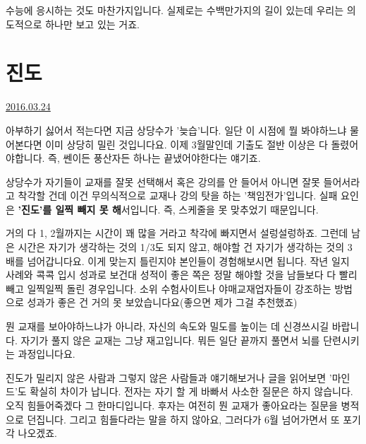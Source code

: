 수능에 응시하는 것도 마찬가지입니다. 실제로는 수백만가지의 길이 있는데 우리는 의도적으로 하나만 보고 있는 거죠.
\vspace{5mm}






\section{진도}
\href{https://www.kockoc.com/Apoc/692514}{2016.03.24}

\vspace{5mm}

아부하기 싫어서 적는다면 지금 상당수가 '늦습'니다.
일단 이 시점에 뭘 봐야하느냐 물어본다면 이미 상당히 밀린 것입니다요.
이제 3월말인데 기출도 절반 이상은 다 돌렸어야합니다. 즉, 쎈이든 풍산자든 하나는 끝냈어야한다는 얘기죠.
\vspace{5mm}

상당수가 자기들이 교재를 잘못 선택해서 혹은 강의를 안 들어서 아니면 잘못 들어서라고 착각할 건데
이건 무의식적으로 교재나 강의 탓을 하는 '책임전가'입니다.
실패 요인은 \textbf{'진도'를 일찍 빼지 못 해}서입니다.
즉, 스케줄을 못 맞추었기 때문입니다.
\vspace{5mm}

거의 다 1, 2월까지는 시간이 꽤 많을 거라고 착각에 빠지면서 설렁설렁하죠.
그런데 남은 시간은 자기가 생각하는 것의 1/3도 되지 않고, 해야할 건 자기가 생각하는 것의 3배를 넘어갑니다요.
이게 맞는지 틀린지야 본인들이 경험해보시면 됩니다.
작년 일지 사례와 콕콕 입시 성과로 보건대 성적이 좋은 쪽은 정말 해야할 것을 남들보다 다 빨리 빼고 일찍일찍 돌린 경우입니다.
소위 수험사이트나 야매교재업자들이 강조하는 방법으로 성과가 좋은 건 거의 못 보았습니다요(좋으면 제가 그걸 추천했죠)
\vspace{5mm}

뭔 교재를 보아야하느냐가 아니라, 자신의 속도와 밀도를 높이는 데 신경쓰시길 바랍니다.
자기가 풀지 않은 교재는 그냥 재고입니다. 뭐든 일단 끝까지 풀면서 뇌를 단련시키는 과정입니다요.
\vspace{5mm}

진도가 밀리지 않은 사람과 그렇지 않은 사람들과 얘기해보거나 글을 읽어보면 '마인드'도 확실히 차이가 납니다.
전자는 자기 할 게 바빠서 사소한 질문은 하지 않습니다. 오직 힘들어죽겠다 그 한마디입니다.
후자는 여전히 뭔 교재가 좋아요라는 질문을 병적으로 던집니다. 그리고 힘들다라는 말을 하지 않아요,
그러다가 6월 넘어가면서 또 포기각 나오겠죠.
\vspace{5mm}









